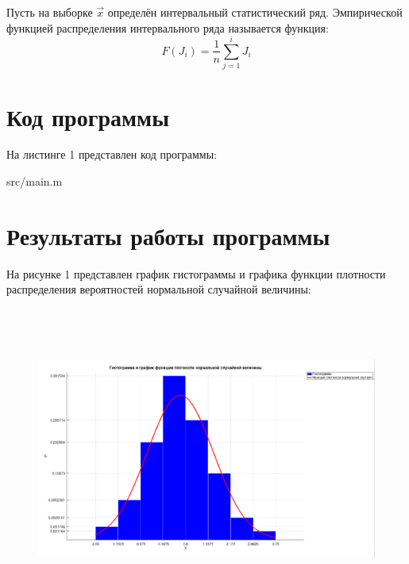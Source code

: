 Пусть на выборке $\vec{x}$ определён интервальный статистический ряд. Эмпирической функцией распределения интервального ряда называется функция:
\begin{equation}
F(J_i) = \frac{1}{n}\sum_{j = 1}^{i}J_i
\end{equation}

\newpage
\section*{Код программы}
На листинге 1 представлен код программы:
\FloatBarrier
\begin{lstinputlisting}{src/main.m}
\end{lstinputlisting}
\FloatBarrier

\section*{Результаты работы программы}
На рисунке 1 представлен график гистограммы и графика функции плотности распределения вероятностей нормальной случайной величины:
\FloatBarrier
\begin{figure}[h]
	\begin{center}
		\includegraphics[width=\linewidth, height=10cm]{inc/hist.png}
	\end{center}
\end{figure}
\FloatBarrier

